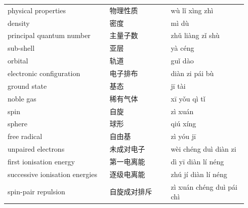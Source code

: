 \documentclass[11pt]{article}
\begin{document}
\begin{longtable}{@{}p{0.40\linewidth}p{0.24\linewidth}p{0.30\linewidth}@{}}
physical properties & 物理性质 & wù lǐ xìng zhì \\
density & 密度 & mì dù \\
principal quantum number & 主量子数 & zhǔ liàng zǐ shù \\
sub-shell & 亚层 & yà céng \\
orbital & 轨道 & guǐ dào \\
electronic configuration & 电子排布 & diàn zi pái bù \\
ground state & 基态 & jī tài \\
noble gas & 稀有气体 & xī yǒu qì tǐ \\
spin & 自旋 & zì xuán \\
sphere & 球形 & qiú xíng \\
free radical & 自由基 & zì yóu jī \\
unpaired electrons & 未成对电子 & wèi chéng duì diàn zi \\
first ionisation energy & 第一电离能 & dì yī diàn lí néng \\
successive ionisation energies & 逐级电离能 & zhú jí diàn lí néng \\
spin-pair repulsion & 自旋成对排斥 & zì xuán chéng duì pái chì \\
\end{longtable}
\end{document}
